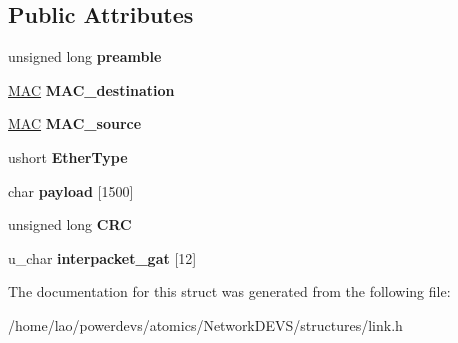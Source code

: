 \subsection*{Public Attributes}
\begin{DoxyCompactItemize}
\item 
unsigned long {\bfseries preamble}\hypertarget{structlink_1_1Frame_a560843e736beacb7e8dec851f4ee1f9e}{}\label{structlink_1_1Frame_a560843e736beacb7e8dec851f4ee1f9e}

\item 
\hyperlink{structMAC}{M\+AC} {\bfseries M\+A\+C\+\_\+destination}\hypertarget{structlink_1_1Frame_aa85e5728d6dfab309546d55c74a5def3}{}\label{structlink_1_1Frame_aa85e5728d6dfab309546d55c74a5def3}

\item 
\hyperlink{structMAC}{M\+AC} {\bfseries M\+A\+C\+\_\+source}\hypertarget{structlink_1_1Frame_a972ec99e9747b045143f6d7c6f4e0bd3}{}\label{structlink_1_1Frame_a972ec99e9747b045143f6d7c6f4e0bd3}

\item 
ushort {\bfseries Ether\+Type}\hypertarget{structlink_1_1Frame_a6ae867ac5cf3d8949d0a8ed72683e14d}{}\label{structlink_1_1Frame_a6ae867ac5cf3d8949d0a8ed72683e14d}

\item 
char {\bfseries payload} \mbox{[}1500\mbox{]}\hypertarget{structlink_1_1Frame_a0aca61f4762da429483aff778ec9f01f}{}\label{structlink_1_1Frame_a0aca61f4762da429483aff778ec9f01f}

\item 
unsigned long {\bfseries C\+RC}\hypertarget{structlink_1_1Frame_abeaa6f98cfe999333b31926b6caf5d84}{}\label{structlink_1_1Frame_abeaa6f98cfe999333b31926b6caf5d84}

\item 
u\+\_\+char {\bfseries interpacket\+\_\+gat} \mbox{[}12\mbox{]}\hypertarget{structlink_1_1Frame_a949962d7ee45bbcf1787640c797e5bf8}{}\label{structlink_1_1Frame_a949962d7ee45bbcf1787640c797e5bf8}

\end{DoxyCompactItemize}


The documentation for this struct was generated from the following file\+:\begin{DoxyCompactItemize}
\item 
/home/lao/powerdevs/atomics/\+Network\+D\+E\+V\+S/structures/link.\+h\end{DoxyCompactItemize}
